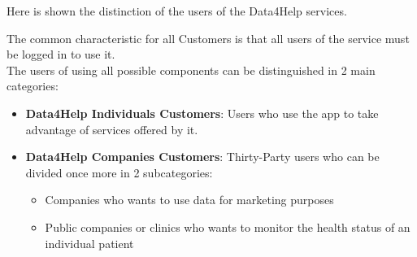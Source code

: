 Here is shown the distinction of the users of the Data4Help services.

\noindent The common characteristic for all Customers is that all users of the service must be logged in to use it.
\\
\noindent The users of using all possible components can be distinguished in 2 main categories:
\\
\begin{itemize}
    \item \textbf{Data4Help Individuals Customers}: Users who use the app to take advantage of services offered by it.
    \item \textbf{Data4Help Companies Customers}: Thirty-Party users who can be divided once more in 2 subcategories:
    \begin{itemize}
        \item Companies who wants to use data for marketing purposes
        \item Public companies or clinics who wants to monitor the health status of an individual patient
    \end{itemize}
\end{itemize}





